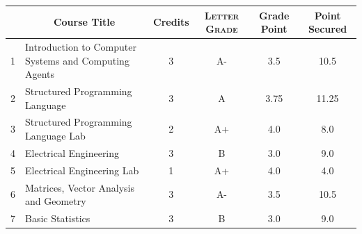 \documentclass[11pt]{article}
\newcommand*{\numtwo}[1]{\pgfmathprintnumber[
                    fixed, precision=2, fixed zerofill=true]{#1}}
\begin{document}
                \begin{center}
                    \renewcommand{\arraystretch}{1.08}
                    
                \begin{tabular}{|c|l|c|>{\scshape}c|c|c|}
                \hline  \rule[-1ex]{0pt}{3.5ex} {\centering{\bf Course Code}} &  \multicolumn{1}{c|}{\textbf{Course Title}}  & {\bf Credits} & {\bf Letter Grade} & {\bf Grade Point} & {\bf Point Secured}  \\ 
                \hline   1 &  Introduction to Computer Systems and Computing Agents		 & 3 & A- & 3.5 & 10.5 \\ %
                \hline   2 &  Structured Programming Language		 & 3 & A & 3.75 & 11.25 \\ %
                \hline   3 &  Structured Programming Language Lab		 & 2 & A+ & 4.0 & 8.0 \\ %
                \hline   4 &  Electrical Engineering		 & 3 & B & 3.0 & 9.0 \\ %
                \hline   5 &  Electrical Engineering Lab		 & 1 & A+ & 4.0 & 4.0 \\ %
                \hline   6 &  Matrices, Vector Analysis and Geometry		 & 3 & A- & 3.5 & 10.5 \\ %
                \hline   7 &  Basic Statistics		 & 3 & B & 3.0 & 9.0 \\ %

\hline                %
                \end{tabular}
                \end{center}
                \renewcommand{\arraystretch}{1.03}
\end{document}

